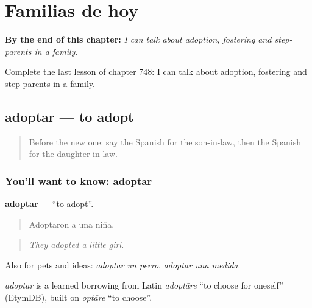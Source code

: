 
\chapter{Familias de hoy}
\label{ch:es-familias-de-hoy}

\begin{chapteropening}
\textbf{By the end of this chapter:} \emph{I can talk about adoption, fostering and step-parents in a family.}

Complete the last lesson of chapter 748: I can talk about adoption, fostering and step-parents in a family.
\end{chapteropening}

\section[adoptar]{adoptar — to adopt}

\label{lesson:ES-C748-adoptar}



\begin{quote}
Before the new one: say the Spanish for the son-in-law, then the Spanish for the daughter-in-law.
\end{quote}

\subsection*{You'll want to know: adoptar}
\textbf{adoptar} — \textquotedblleft{}to adopt\textquotedblright{}.

\begin{quote}
Adoptaron a una niña.
\end{quote}

\begin{quote}
\emph{They adopted a little girl.}
\end{quote}

Also for pets and ideas: \emph{adoptar un perro}, \emph{adoptar una medida}.

\begin{cousinweb}
\emph{adoptar} is a learned borrowing from Latin \emph{adoptāre} \textquotedblleft{}to choose for oneself\textquotedblright{} (EtymDB), built on \emph{optāre} \textquotedblleft{}to choose\textquotedblright{}.
\end{cousinweb}


